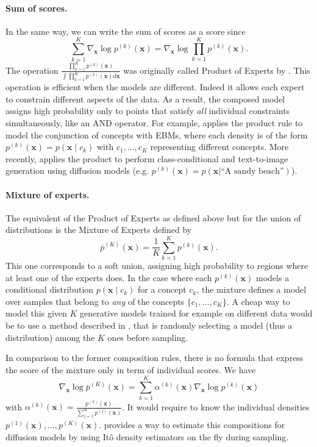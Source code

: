\documentclass[10pt]{article} %
\newcommand{\engquote}[1]{``#1''}
\def\rvx{{\mathbf{x}}}
\begin{document}
\paragraph{Sum of scores.} In the same way, we can write the sum of scores as a score since
\begin{equation}
\sum_{k=1}^K \nabla_{\rvx} \log p^{(k)}(\rvx) = \nabla_\rvx \log  \prod_{k=1}^K p^{(k)}(\rvx).
\end{equation}
The operation $\frac{\prod_{k=1}^K p^{(k)}(\rvx)}{ \int \prod_{k=1}^K p^{(k)}(\rvx)\mathrm{d}\rvx}$ was originally called Product of Experts by \citet{hinton2002}. This operation is efficient when the models are different. Indeed it allows each expert to constrain different aspects of the data. As a result, the composed model assigns high probability only to points that satisfy \textit{all} individual constraints simultaneously, like an AND operator. For example, \citet{du2020compositional} applies the product rule to model the conjunction of concepts with EBMs, where each density is of the form $p^{(k)}(\rvx) = p(\rvx \mid c_k)$ with $c_1, \dots, c_K$ representing different concepts. More recently, \citet{du2023reducereuserecyclecompositional} applies the product to perform class-conditional and text-to-image generation using diffusion models (e.g. $p^{(k)}(\rvx) = p(\rvx|\text{\engquote{A sandy beach}}) $). 


\paragraph{Mixture of experts.} The equivalent of the Product of Experts as defined above but for the union of distributions is the Mixture of Experts defined by
\begin{equation}
\overline{p}^{(K)}(\rvx) = \frac{1}{K}\sum_{k=1}^K p^{(k)}(\rvx).
\end{equation}
This one corresponds to a soft union, assigning high probability to regions where at least one of the experts does. In the case where each $p^{(k)}(\rvx)$ models a conditional distribution $p(\rvx \mid c_k)$ for a concept $c_k$, the mixture defines a model over samples that belong to \textit{any} of the concepts $\{c_1, \dots, c_K\}$. A cheap way to model this given $K$ generative models trained for example on different data would be to use a method described in , that is randomly selecting a model (thus a distribution) among the $K$ ones before sampling. 

In comparison to the former composition rules, there is no formula that express the score of the mixture only in term of individual scores. We have \begin{equation}\nabla_{\rvx} \log \overline{p}^{(K)}(\rvx) = \sum_{k=1}^K \alpha^{(k)}(\rvx) \nabla_\rvx \log p^{(k)}(\rvx)\end{equation} with $\alpha^{(k)}(\rvx) = \frac{p^{(k)}(\rvx)}{\sum_{j=1}^K p^{(j)}(\rvx)}$. It would require to know the individual densities $p^{(1)}(\rvx),\dots,p^{(K)}(\rvx)$. \citet{skreta2024superposition} provides a way to estimate this compositions for diffusion models by using Itô density estimators on the fly during sampling.
\end{document}
